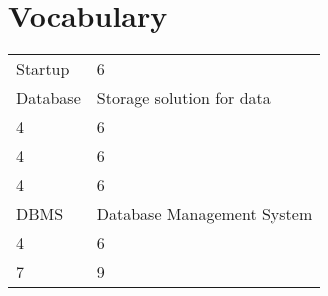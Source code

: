 \thispagestyle{plain}			%
\section*{Vocabulary}
\begin{tabular}{ p{3cm} | p{10cm} }
    \hline
    Startup & 6 \\
    Database & Storage solution for data \\
    4 & 6 \\
    4 & 6 \\
    4 & 6 \\
    DBMS & Database Management System \\
    4 & 6 \\
    7 & 9 \\
\end{tabular}
